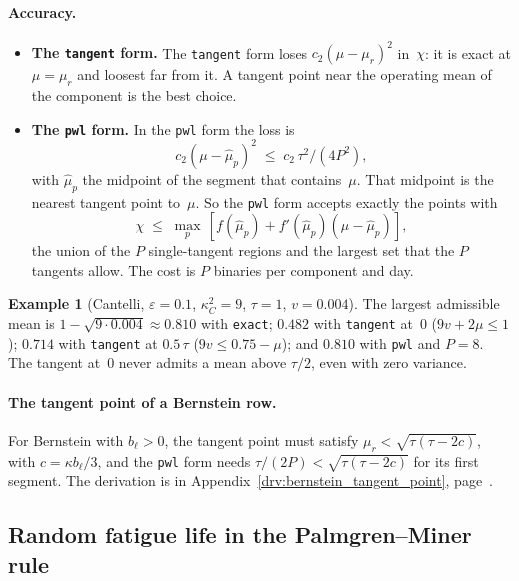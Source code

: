 \documentclass[11pt,a4paper]{article}
\theoremstyle{plain}
\theoremstyle{definition}
\newtheorem{example}[theorem]{Example}
\theoremstyle{remark}
\begin{document}
\paragraph{Accuracy.}
\begin{itemize}
  \item \textbf{The \texttt{tangent} form.} The \texttt{tangent} form loses $c_2(\mu - \mu_r)^2$ in~$\chi$: it is exact at $\mu = \mu_r$ and loosest far from it.
    A tangent point near the operating mean of the component is the best choice.
  \item \textbf{The \texttt{pwl} form.} In the \texttt{pwl} form the loss is
    \begin{equation}
      c_2(\mu - \hat\mu_p)^2 \;\le\; c_2\,\tau^2/(4P^2),
    \end{equation}
    with $\hat\mu_p$ the midpoint of the segment that contains~$\mu$.
    That midpoint is the nearest tangent point to~$\mu$.
    So the \texttt{pwl} form accepts exactly the points with
    \begin{equation}
      \chi \;\le\; \max_p\, [f(\hat\mu_p) + f'(\hat\mu_p)(\mu - \hat\mu_p)],
    \end{equation}
    the union of the $P$ single-tangent regions and the largest set that the $P$ tangents allow.
    The cost is $P$ binaries per component and day.
\end{itemize}

\begin{example}[Cantelli, $\varepsilon = 0.1$, $\kappa_C^2 = 9$, $\tau = 1$, $v = 0.004$]
The largest admissible mean is $1 - \sqrt{9 \cdot 0.004} \approx 0.810$ with \texttt{exact}; $0.482$ with \texttt{tangent} at~$0$ ($9v + 2\mu \le 1$); $0.714$ with \texttt{tangent} at $0.5\,\tau$ ($9v \le 0.75 - \mu$); and $0.810$ with \texttt{pwl} and $P = 8$.
The tangent at~$0$ never admits a mean above $\tau/2$, even with zero variance.
\end{example}

\paragraph{The tangent point of a Bernstein row.}
For Bernstein with $b_\ell > 0$, the tangent point must satisfy $\mu_r < \sqrt{\tau(\tau - 2c)}$, with $c = \kappa b_\ell/3$, and the \texttt{pwl} form needs $\tau/(2P) < \sqrt{\tau(\tau - 2c)}$ for its first segment.
The derivation is in Appendix~\ref{drv:bernstein_tangent_point}, page~\pageref{drv:bernstein_tangent_point}.

\subsection{Random fatigue life in the Palmgren--Miner rule}
\label{sec:miner_randomN}
\end{document}
